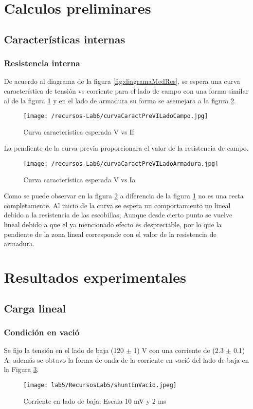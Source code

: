\documentclass[11pt,letterpaper]{article}     %
\begin{document}
\section{Calculos preliminares}
\subsection{Características internas}
\subsubsection{Resistencia interna }
De acuerdo al diagrama de la figura \ref{fig:diagramaMedRes},  se espera una curva característica de tensión vs corriente para el lado de campo con una forma similar al de la figura \ref{fig:curvaCaractPreVILadoCampo} y en el lado de armadura su forma se asemejara a la figura \ref{fig:curvaCaractPreVILadoArmadura}.
\begin{figure}[H]
    \centering
    \texttt{[image: /recursos-Lab6/curvaCaractPreVILadoCampo.jpg]}
    \caption{Curva característica esperada V vs If}
    \label{fig:curvaCaractPreVILadoCampo}
\end{figure}
La pendiente de la curva previa proporcionara el valor de la resistencia de campo.
\begin{figure}[H]
    \centering
    \texttt{[image: /recursos-Lab6/curvaCaractPreVILadoArmadura.jpg]}
    \caption{Curva característica esperada V vs Ia}
    \label{fig:curvaCaractPreVILadoArmadura}
\end{figure} 
Como se puede observar en la figura \ref{fig:curvaCaractPreVILadoArmadura} a diferencia de la figura \ref{fig:curvaCaractPreVILadoCampo} no es una recta completamente. Al inicio de la curva se espera un comportamiento no lineal debido a la resistencia de las escobillas; Aunque desde cierto punto se vuelve lineal debido a que el ya mencionado efecto es despreciable, por lo que la pendiente de la zona lineal corresponde con el valor de la resistencia de armadura. 
\section{Resultados experimentales}
\subsection{Carga lineal}
\subsubsection{Condición en vació}
Se fijo la tensión en el lado de baja (120 $\pm$ 1) V con una corriente de (2.3 $\pm$ 0.1) A; además se obtuvo la forma de onda de la corriente en vació del lado de baja en la Figura \ref{ShuntEnVacio}.
\begin{figure}[H]
    \centering
    \texttt{[image: lab5/RecursosLab5/shuntEnVacio.jpeg]}
    \caption{Corriente en lado de baja. Escala 10 mV y 2 ms }
    \label{ShuntEnVacio}
\end{figure}
\end{document}
